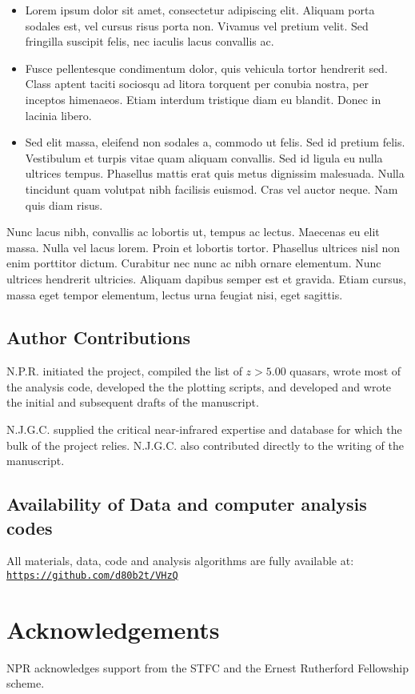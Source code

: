 \documentclass[usenatbib]{mnras}
\begin{document}
\begin{itemize}
    \item Lorem ipsum dolor sit amet, consectetur adipiscing
      elit. Aliquam porta sodales est, vel cursus risus porta non. Vivamus
      vel pretium velit. Sed fringilla suscipit felis, nec iaculis lacus
      convallis ac. 
    \item Fusce pellentesque condimentum dolor, quis vehicula
      tortor hendrerit sed. Class aptent taciti sociosqu ad litora torquent
      per conubia nostra, per inceptos himenaeos. Etiam interdum tristique
      diam eu blandit. Donec in lacinia libero.
    \item Sed elit massa, eleifend non sodales a, commodo ut felis. Sed id
      pretium felis. Vestibulum et turpis vitae quam aliquam convallis. Sed
      id ligula eu nulla ultrices tempus. Phasellus mattis erat quis metus
      dignissim malesuada. Nulla tincidunt quam volutpat nibh facilisis
      euismod. Cras vel auctor neque. Nam quis diam risus.
\end{itemize}
Nunc lacus nibh, convallis ac lobortis ut, tempus ac lectus. Maecenas
eu elit massa. Nulla vel lacus lorem. Proin et lobortis
tortor. Phasellus ultrices nisl non enim porttitor dictum. Curabitur
nec nunc ac nibh ornare elementum. Nunc ultrices hendrerit
ultricies. Aliquam dapibus semper est et gravida. Etiam cursus, massa
eget tempor elementum, lectus urna feugiat nisi, eget sagittis.

\subsection*{Author Contributions}   
N.P.R. initiated the project, compiled the list of $z>5.00$ quasars, wrote most of the analysis code, developed the the plotting scripts, and developed and wrote the initial and subsequent drafts of the manuscript.

N.J.G.C. supplied the critical near-infrared expertise and database for which the bulk of the project relies. N.J.G.C. also contributed directly to the writing of the manuscript.


\subsection*{Availability of Data and computer analysis codes} 
All materials, data, code and analysis algorithms are fully 
available at: 
\href{https://github.com/d80b2t/VHzQ}{\tt https://github.com/d80b2t/VHzQ}


\section*{Acknowledgements}
NPR acknowledges support from the STFC and the Ernest Rutherford Fellowship scheme. 
\end{document}

